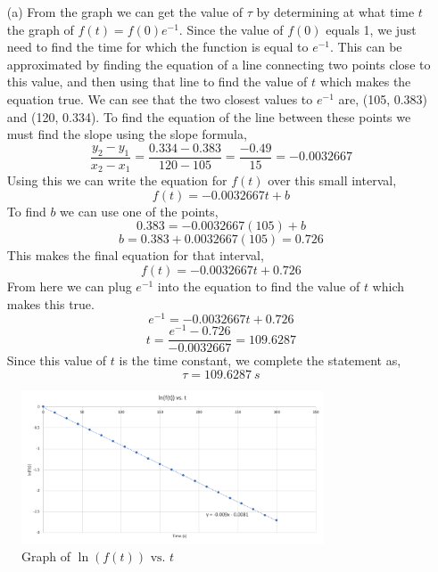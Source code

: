 \documentclass[12pt]{article}
\begin{document}
    \begin{itemize}
        \item[(a)]
            From the graph we can get the value of $\tau$ by determining at what time $t$ the graph of $f(t) = f(0)e^{-1}$. Since the value of $f(0)$ equals 1, we just need to find the time for which the function is equal to $e^{-1}$. This can be approximated by finding the equation of a line connecting two points close to this value, and then using that line to find the value of $t$ which makes the equation true. We can see that the two closest values to $e^{-1}$ are, (105, 0.383) and (120, 0.334). To find the equation of the line between these points we must find the slope using the slope formula,
            \[
                \frac{y_2 - y_1}{x_2 - x_1} = \frac{0.334 - 0.383}{120 - 105} =
                \frac{-0.49}{15} = -0.0032667
            \]
            Using this we can write the equation for $f(t)$ over this small interval,
            \[
                f(t) = -0.0032667 t + b
            \]
            To find $b$ we can use one of the points,
            \[
                0.383 = -0.0032667 (105) + b
            \]
            \[
                b = 0.383 + 0.0032667(105) = 0.726
            \]
            This makes the final equation for that interval,
            \[
                f(t) = -0.0032667 t + 0.726
            \]
            From here we can plug $e^{-1}$ into the equation to find the value of $t$ which makes this true.
            \[
                e^{-1} = -0.0032667 t + 0.726
            \]
            \[
                t = \frac{e^{-1} - 0.726}{-0.0032667} = 109.6287
            \]
            Since this value of $t$ is the time constant, we complete the statement as,
            \[
                \boxed{\tau = 109.6287\ s}
            \]
    \end{itemize}
    \newpage
    \begin{figure}[h]
        \centering
        \includegraphics[width=0.8\textwidth]{5.1 Graph 2.png}
        \caption{Graph of $\ln(f(t)) \text{ vs. } t$}
    \end{figure}
\end{document}
